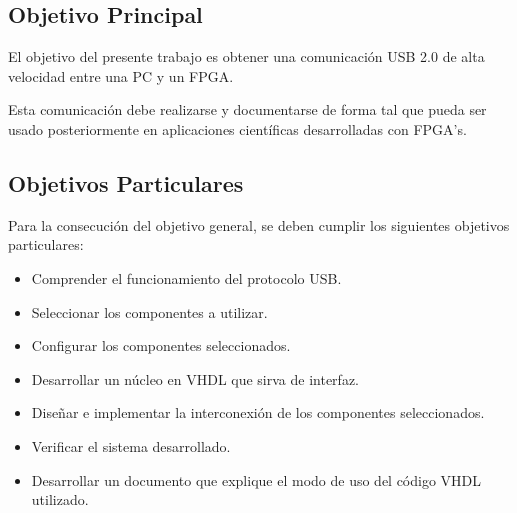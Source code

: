 \subsection{Objetivo Principal}
	El objetivo del presente trabajo es obtener una comunicación USB 2.0 de alta velocidad entre una PC y un FPGA.%
	
	Esta comunicación debe realizarse y documentarse de forma tal que pueda ser usado posteriormente en aplicaciones científicas desarrolladas con FPGA's.
	
\subsection{Objetivos Particulares}
	Para la consecución del objetivo general, se deben cumplir los siguientes objetivos particulares:
	
	\begin{itemize}
		\item Comprender el funcionamiento del protocolo USB.
		\item Seleccionar los componentes a utilizar.
		\item Configurar los componentes seleccionados.
		\item Desarrollar un núcleo en VHDL que sirva de interfaz.
		\item Diseñar e implementar la interconexión de los componentes seleccionados.
		\item Verificar el sistema desarrollado.
		\item Desarrollar un documento que explique el modo de uso del código VHDL utilizado.
	\end{itemize}